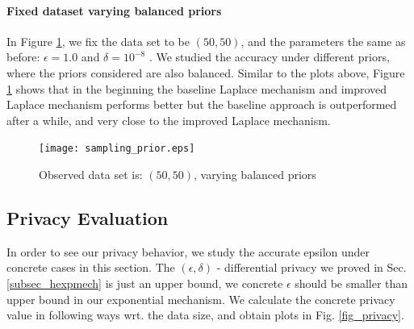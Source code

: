 \documentclass{article}
\begin{document}
\paragraph{Fixed dataset varying balanced priors}
\label{subsubsec_vs_prior}
In Figure \ref{fig_vs_prior}, we fix the data set to be $(50,50)$, and the parameters the same as before: $\epsilon = 1.0$ and $\delta = 10^{-8}$ . We studied the accuracy under different priors, where the priors considered  are also balanced.
Similar to the plots above, Figure \ref{fig_vs_prior} shows that in the beginning the baseline Laplace mechanism and improved Laplace mechanism performs better but the baseline approach is outperformed after a while, and very close to the improved Laplace mechanism.
\begin{figure}
\centering
\texttt{[image: sampling\_prior.eps]}
\caption{Observed data set is: $(50,50)$, varying balanced priors}
\label{fig_vs_prior}
\end{figure}

\subsection{Privacy Evaluation}
\label{subsec_experiment_privacy}
In order to see our privacy behavior, we study the accurate epsilon under concrete cases in this section. The $(\epsilon, \delta)$ - differential privacy we proved in Sec. \ref{subsec_hexpmech} is just an upper bound, we concrete $\epsilon$ should be smaller than upper bound in our exponential mechanism. We calculate the concrete privacy value in following ways wrt. the data size, and obtain plots in Fig. \ref{fig_privacy}.
\end{document}
